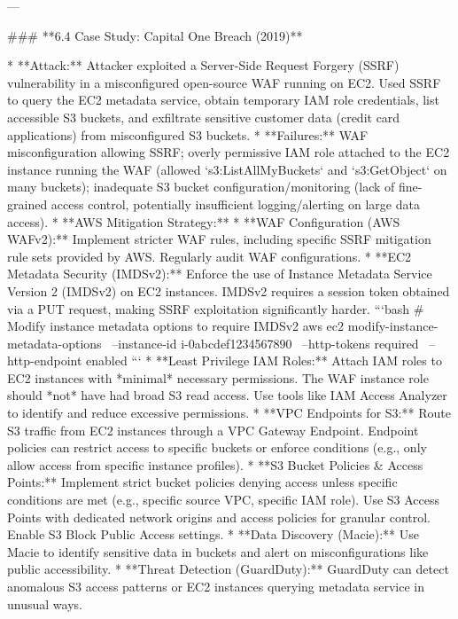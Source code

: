 \documentclass{article}
\begin{document}
---

### **6.4 Case Study: Capital One Breach (2019)**

* **Attack:** Attacker exploited a Server-Side Request Forgery (SSRF) vulnerability in a misconfigured open-source WAF running on EC2. Used SSRF to query the EC2 metadata service, obtain temporary IAM role credentials, list accessible S3 buckets, and exfiltrate sensitive customer data (credit card applications) from misconfigured S3 buckets.
* **Failures:** WAF misconfiguration allowing SSRF; overly permissive IAM role attached to the EC2 instance running the WAF (allowed `s3:ListAllMyBuckets` and `s3:GetObject` on many buckets); inadequate S3 bucket configuration/monitoring (lack of fine-grained access control, potentially insufficient logging/alerting on large data access).
* **AWS Mitigation Strategy:**
    * **WAF Configuration (AWS WAFv2):** Implement stricter WAF rules, including specific SSRF mitigation rule sets provided by AWS. Regularly audit WAF configurations.
    * **EC2 Metadata Security (IMDSv2):** Enforce the use of Instance Metadata Service Version 2 (IMDSv2) on EC2 instances. IMDSv2 requires a session token obtained via a PUT request, making SSRF exploitation significantly harder.
        ```bash
        # Modify instance metadata options to require IMDSv2
        aws ec2 modify-instance-metadata-options \
            --instance-id i-0abcdef1234567890 \
            --http-tokens required \
            --http-endpoint enabled
        ```
    * **Least Privilege IAM Roles:** Attach IAM roles to EC2 instances with *minimal* necessary permissions. The WAF instance role should *not* have had broad S3 read access. Use tools like IAM Access Analyzer to identify and reduce excessive permissions.
    * **VPC Endpoints for S3:** Route S3 traffic from EC2 instances through a VPC Gateway Endpoint. Endpoint policies can restrict access to specific buckets or enforce conditions (e.g., only allow access from specific instance profiles).
    * **S3 Bucket Policies & Access Points:** Implement strict bucket policies denying access unless specific conditions are met (e.g., specific source VPC, specific IAM role). Use S3 Access Points with dedicated network origins and access policies for granular control. Enable S3 Block Public Access settings.
    * **Data Discovery (Macie):** Use Macie to identify sensitive data in buckets and alert on misconfigurations like public accessibility.
    * **Threat Detection (GuardDuty):** GuardDuty can detect anomalous S3 access patterns or EC2 instances querying metadata service in unusual ways.
\end{document}
